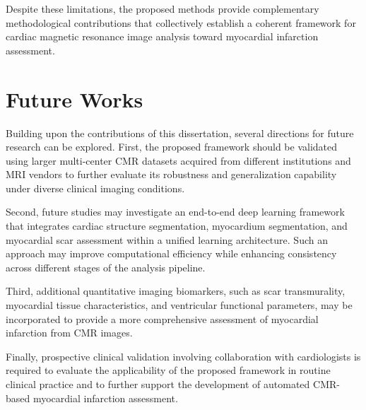 Despite these limitations, the proposed methods provide complementary methodological contributions that collectively establish a coherent framework for cardiac magnetic resonance image analysis toward myocardial infarction assessment.

\section{Future Works}
\label{sec:ch7-future-work}

Building upon the contributions of this dissertation, several directions for future research can be explored. First, the proposed framework should be validated using larger multi-center CMR datasets acquired from different institutions and MRI vendors to further evaluate its robustness and generalization capability under diverse clinical imaging conditions.

Second, future studies may investigate an end-to-end deep learning framework that integrates cardiac structure segmentation, myocardium segmentation, and myocardial scar assessment within a unified learning architecture. Such an approach may improve computational efficiency while enhancing consistency across different stages of the analysis pipeline.

Third, additional quantitative imaging biomarkers, such as scar transmurality, myocardial tissue characteristics, and ventricular functional parameters, may be incorporated to provide a more comprehensive assessment of myocardial infarction from CMR images.

Finally, prospective clinical validation involving collaboration with cardiologists is required to evaluate the applicability of the proposed framework in routine clinical practice and to further support the development of automated CMR-based myocardial infarction assessment.